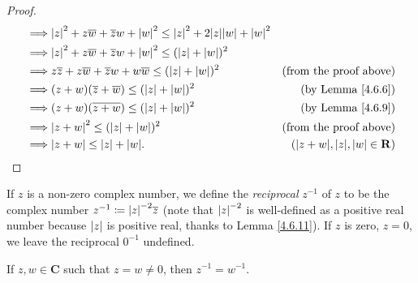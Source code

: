 \begin{proof}
\begin{align*}
        \implies & \abs*{z}^2 + z \overline{w} + \overline{z} w + \abs*{w}^2 \leq \abs*{z}^2 + 2 \abs*{z} \abs*{w} + \abs*{w}^2                                                     \\
        \implies & \abs*{z}^2 + z \overline{w} + \overline{z} w + \abs*{w}^2 \leq (\abs*{z} + \abs*{w})^2                                                                           \\
        \implies & z \overline{z} + z \overline{w} + \overline{z} w + w \overline{w} \leq (\abs*{z} + \abs*{w})^2               & \text{(from the proof above)}                     \\
        \implies & (z + w) (\overline{z} + \overline{w}) \leq (\abs*{z} + \abs*{w})^2                                           & \text{(by Lemma \ref{4.6.6})}                     \\
        \implies & (z + w) (\overline{z + w}) \leq (\abs*{z} + \abs*{w})^2                                                      & \text{(by Lemma \ref{4.6.9})}                     \\
        \implies & \abs*{z + w}^2 \leq (\abs*{z} + \abs*{w})^2                                                                  & \text{(from the proof above)}                     \\
        \implies & \abs*{z + w} \leq \abs*{z} + \abs*{w}.                                                                       & (\abs*{z + w}, \abs*{z}, \abs*{w} \in \mathbf{R})
    \end{align*}
\end{proof}

\begin{definition}\label{4.6.12}
    If \(z\) is a non-zero complex number, we define the \emph{reciprocal} \(z^{-1}\) of \(z\) to be the complex number \(z^{-1} \coloneqq \abs*{z}^{-2} \overline{z}\)
    (note that \(\abs*{z}^{-2}\) is well-defined as a positive real number because \(\abs*{z}\) is positive real, thanks to Lemma \ref{4.6.11}).
    If \(z\) is zero, \(z = 0\), we leave the reciprocal \(0^{-1}\) undefined.
\end{definition}

\begin{additional corollary}\label{ac 4.6.5}
If \(z, w \in \mathbf{C}\) such that \(z = w \neq 0\), then \(z^{-1} = w^{-1}\).
\end{additional corollary}

